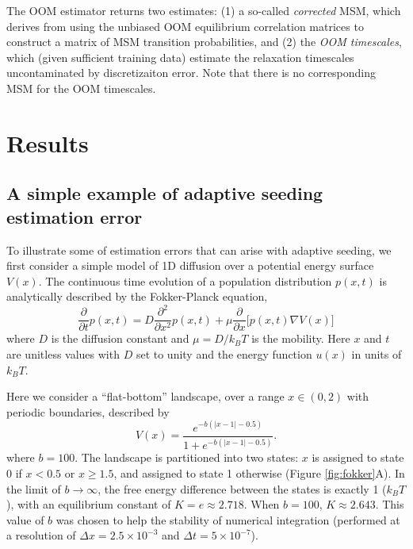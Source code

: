 \documentclass[%
 aip,
rsi,%
 amsmath,amssymb,
 reprint,%
]{revtex4-1}
\begin{document}
The OOM estimator returns two estimates: (1) a so-called \textit{corrected} MSM, which derives from using the unbiased OOM equilibrium correlation matrices to construct a matrix of MSM transition probabilities, and (2) the \textit{OOM timescales}, which (given sufficient training data) estimate the relaxation timescales uncontaminated by discretizaiton error.  Note that there is no corresponding MSM for the OOM timescales. 


\section*{Results}

\subsection*{A simple example of adaptive seeding estimation error}

To illustrate some of estimation errors that can arise with adaptive seeding, we first consider a simple model of 1D diffusion over a potential energy surface $V(x)$.  The continuous time evolution of a population distribution $p(x,t)$ is analytically described by the Fokker-Planck equation,
\begin{equation}
\frac{\partial}{\partial t}p(x,t) = D \frac{\partial^2}{\partial x^2}p(x,t) + \mu \frac{\partial}{\partial x}\big[ p(x,t) \nabla V(x) \big] 
\end{equation}
where $D$ is the diffusion constant and $\mu = D/k_BT$ is the mobility.  Here $x$ and $t$ are unitless values with $D$ set to unity and the energy function $u(x)$ in units of $k_BT$.  


Here we consider a ``flat-bottom'' landscape, over a range $x \in (0,2)$ with periodic boundaries, described by
\begin{equation}
V(x) = \frac{e^{-b(|x-1|-0.5)}}{1 + e^{-b(|x-1|-0.5)}}.
\end{equation}
where $b = 100$.  The landscape is partitioned into two states: $x$ is assigned to state 0 if $x < 0.5$ or $x \geq 1.5$, and assigned to state 1 otherwise (Figure \ref{fig:fokker}A). In the limit of $b \rightarrow \infty$, the free energy difference between the states is exactly 1 ($k_BT$), with an equilibrium constant of $K = e \approx 2.718$.  When $b=100$, $K \approx 2.643$.  This value of $b$ was chosen to help the stability of numerical integration (performed at a resolution of $\Delta x = 2.5 \times 10^{-3}$ and $\Delta t = 5 \times 10^{-7}$). 
\end{document}
